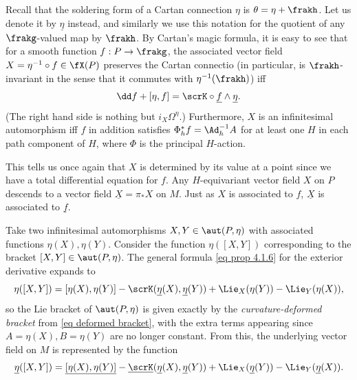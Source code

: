 Recall that the soldering form of a Cartan connection $\eta$ is $\theta=\eta+\frakh$. Let us denote it by $\underline{\eta}$ instead, and similarly we use this notation for the quotient of any $\frakg$-valued map by $\frakh$. By Cartan's magic formula, it is easy to see that for a smooth function $f:P\to \frakg$, the associated vector field $X=\eta^{-1}\circ f\in \fX(P)$ preserves the Cartan connectio (in particular, is $\frakh$-invariant in the sense that it commutes with $\eta^{-1}(\frakh)$) iff 
\[\dd f+[\eta,f]=\scrK\circ \underline{f}\wedge\underline{\eta}.\]
(The right hand side is nothing but $i_X \Omega^\eta$.) Furthermore, $X$ is an infinitesimal automorphism iff $f$ in addition satisfies $\Phi_h^\ast f=\Ad_h^{-1}A$ for at least one $H$ in each path component of $H$, where $\Phi$ is the principal $H$-action.

This tells us once again that $X$ is determined by its value at a point since we have a total differential equation for $f$. Any $H$-equivariant vector field $X$ on $P$ descends to a vector field $\underline{X}=\pi_\ast X$ on $M$. Just as $X$ is associated to $f$, $\underline{X}$ is associated to $\underline{f}$.

Take two infinitesimal automorphisms $X,Y\in\aut(P,\eta)$ with associated functions $\eta(X),\eta(Y)$. Consider the function $\eta([X,Y])$ corresponding to the bracket $[X,Y]\in \aut(P,\eta)$. The general formula \eqref{eq prop 4.1.6} for the exterior derivative expands to 
\[\eta([X,Y])=[\eta(X),\eta(Y)]-\scrK(\underline{\eta}(X),\underline{\eta}(Y))+\Lie_X (\eta(Y))-\Lie_{Y}(\eta(X)),\]
 so the Lie bracket of $\aut(P,\eta)$ is given exactly by the \emph{curvature-deformed bracket} from \eqref{eq deformed bracket}, with the extra terms appearing since $A=\eta(X),B=\eta(Y)$ are no longer constant. From this, the underlying vector field on $M$ is represented by the function
\[\underline{\eta}([X,Y])=\underline{[\eta(X),\eta(Y)]}-\underline{\scrK}(\underline{\eta}(X),\underline{\eta}(Y))+\Lie_X (\underline{\eta}(Y))-\Lie_Y (\underline{\eta}(X)).\]

